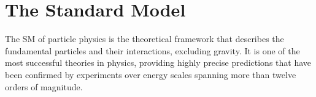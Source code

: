 
\section{The Standard Model}

The SM of particle physics is the theoretical framework that describes the fundamental particles and their interactions, excluding gravity. It is one of the most successful theories in physics, providing highly precise predictions that have been confirmed by experiments over energy scales spanning more than twelve orders of magnitude.






